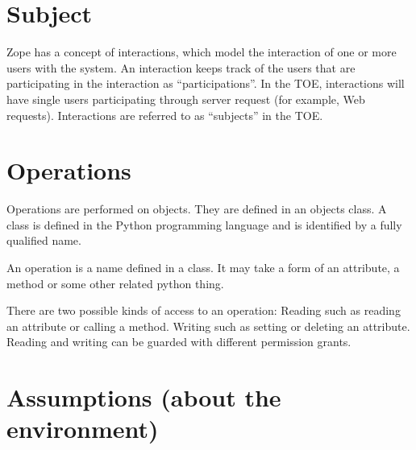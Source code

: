 \documentclass[12pt,english]{scrbook}
\begin{document}



\section{Subject}

Zope has a concept of interactions, which model the interaction of one
or more users with the system.  An interaction keeps track of the
users that are participating in the interaction as ``participations''.
In the TOE, interactions will have single users participating through
server request (for example, Web requests).  Interactions are referred
to as ``subjects'' in the TOE.





\section{Operations}

Operations are performed on objects. They are defined in an objects class. A
class is defined in the Python programming language and is identified by a
fully qualified name.

An operation is a name defined in a class. It may take a form of an attribute, a
method or some other related python thing.

There are two possible kinds of access to an operation: Reading such as
reading an attribute or calling a method. Writing such as setting or deleting
an attribute. Reading and writing can be guarded with different permission grants.





\section{Assumptions (about the environment)}
\end{document}
